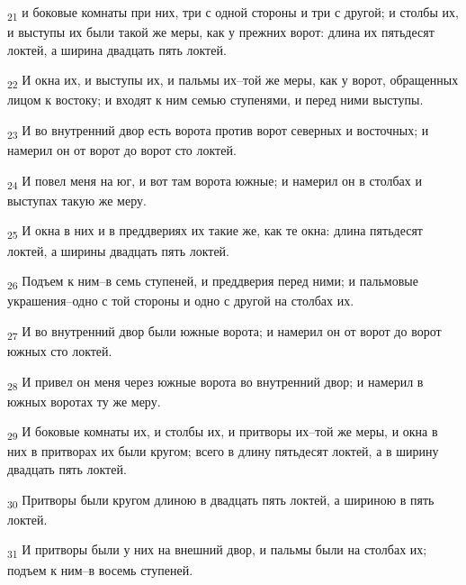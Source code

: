 \begin{tcolorbox}
\textsubscript{21} и боковые комнаты при них, три с одной стороны и три с другой; и столбы их, и выступы их были такой же меры, как у прежних ворот: длина их пятьдесят локтей, а ширина двадцать пять локтей.
\end{tcolorbox}
\begin{tcolorbox}
\textsubscript{22} И окна их, и выступы их, и пальмы их--той же меры, как у ворот, обращенных лицом к востоку; и входят к ним семью ступенями, и перед ними выступы.
\end{tcolorbox}
\begin{tcolorbox}
\textsubscript{23} И во внутренний двор есть ворота против ворот северных и восточных; и намерил он от ворот до ворот сто локтей.
\end{tcolorbox}
\begin{tcolorbox}
\textsubscript{24} И повел меня на юг, и вот там ворота южные; и намерил он в столбах и выступах такую же меру.
\end{tcolorbox}
\begin{tcolorbox}
\textsubscript{25} И окна в них и в преддвериях их такие же, как те окна: длина пятьдесят локтей, а ширины двадцать пять локтей.
\end{tcolorbox}
\begin{tcolorbox}
\textsubscript{26} Подъем к ним--в семь ступеней, и преддверия перед ними; и пальмовые украшения--одно с той стороны и одно с другой на столбах их.
\end{tcolorbox}
\begin{tcolorbox}
\textsubscript{27} И во внутренний двор были южные ворота; и намерил он от ворот до ворот южных сто локтей.
\end{tcolorbox}
\begin{tcolorbox}
\textsubscript{28} И привел он меня через южные ворота во внутренний двор; и намерил в южных воротах ту же меру.
\end{tcolorbox}
\begin{tcolorbox}
\textsubscript{29} И боковые комнаты их, и столбы их, и притворы их--той же меры, и окна в них в притворах их были кругом; всего в длину пятьдесят локтей, а в ширину двадцать пять локтей.
\end{tcolorbox}
\begin{tcolorbox}
\textsubscript{30} Притворы были кругом длиною в двадцать пять локтей, а шириною в пять локтей.
\end{tcolorbox}
\begin{tcolorbox}
\textsubscript{31} И притворы были у них на внешний двор, и пальмы были на столбах их; подъем к ним--в восемь ступеней.
\end{tcolorbox}
